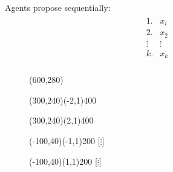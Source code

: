 \documentclass[12pt]{article}
\newcommand{\n}{\noindent}
\newcommand{\s}{\vspace{5mm}}
\begin{document}
\s
\n  Agents propose sequentially:
\begin{eqnarray*}
\begin{array}{cc}
1.&x_i\\
2.&x_2\\
\vdots&\vdots\\
k.&x_k\\
\end{array}
\end{eqnarray*}








\begin{figure}[htb]
\hspace*{\fill}
\begin{egame}(600,280)

\renewcommand{\egarrowstyle}{}

\putbranch(300,240)(-2,1){400}

\renewcommand{\egarrowstyle}{}

\putbranch(300,240)(2,1){400}

\renewcommand{\egarrowstyle}{}

\putbranch(-100,40)(-1,1){200}
\ib{}{}[$\vdots$] 

\renewcommand{\egarrowstyle}{}

\putbranch(-100,40)(1,1){200}
\ib{}{}[$\vdots$]  


\end{egame}
\end{figure}
\end{document}
